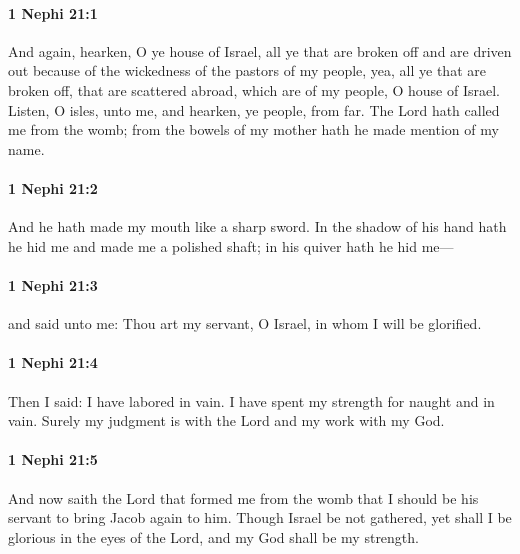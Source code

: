 		\paragraph{1 Nephi 21:1} %
			\label{1NEPHI-21-1}

			And again, hearken, O ye house of Israel,
			all ye that are broken off and are driven out
			because of the wickedness of the pastors of my people,
			yea, all ye that are broken off,
			that are scattered abroad,
			which are of my people, O house of Israel.
			Listen, O isles, unto me,
			and hearken, ye people, from far.
			The Lord hath called me from the womb;
			from the bowels of my mother hath he made mention of my name.

		\paragraph{1 Nephi 21:2} %
			\label{1NEPHI-21-2}

			And he hath made my mouth like a sharp sword.
			In the shadow of his hand hath he hid me
			and made me a polished shaft;
			in his quiver hath he hid me—

		\paragraph{1 Nephi 21:3} %
			\label{1NEPHI-21-3}

			and said unto me:
			Thou art my servant, O Israel,
			in whom I will be glorified.

		\paragraph{1 Nephi 21:4} %
			\label{1NEPHI-21-4}

			Then I said:
			I have labored in vain.
			I have spent my strength for naught and in vain.
			Surely my judgment is with the Lord
			and my work with my God.

		\paragraph{1 Nephi 21:5} %
			\label{1NEPHI-21-5}

			And now saith the Lord that formed me from the womb
			that I should be his servant to bring Jacob again to him.
			Though Israel be not gathered,
			yet shall I be glorious in the eyes of the Lord,
			and my God shall be my strength.

